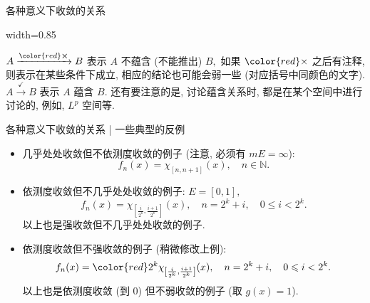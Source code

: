 
\begin{frame}{各种意义下收敛的关系}

\begin{adjustbox}{width=0.85\textwidth}

\end{adjustbox}

$A \xrightarrow{{\color{red} \boldsymbol{\times}}} B$ 表示 $A$ 不蕴含 (不能推出) $B,$ 如果 $\color{red} \times$ 之后有注释, 则表示在某些条件下成立, 相应的结论也可能会弱一些 (对应括号中同颜色的文字). $A \xrightarrow{\checkmark} B$ 表示 $A$ 蕴含 $B.$ 还有要注意的是, 讨论蕴含关系时, 都是在某个空间中进行讨论的, 例如, $L^p$ 空间等.

\end{frame}


\begin{frame}{各种意义下收敛的关系 | {\smaller[1] 一些典型的反例}}

\begin{itemize}[<+->]
\item 几乎处处收敛但不依测度收敛的例子 (注意, 必须有 $m E = \infty$):
\[f_n(x) = \chi_{[n, n + 1]}(x), \quad n \in \mathbb{N}.\]

\item 依测度收敛但不几乎处处收敛的例子: $E = [0, 1],$
\[f_n(x) = \chi_{\left[ \frac{i}{2^k}, \frac{i + 1}{2^k} \right]}(x), \quad n = 2^k + i, \quad 0 \leqslant i < 2^k.\]
以上也是强收敛但不几乎处处收敛的例子.

\item 依测度收敛但不强收敛的例子 (稍微修改上例):
\[f_n(x) = {\color{red} 2^k} \chi_{\left[ \frac{i}{2^k}, \frac{i + 1}{2^k} \right]}(x), \quad n = 2^k + i, \quad 0 \leqslant i < 2^k.\]
以上也是依测度收敛 (到 $0$) 但不弱收敛的例子 (取 $g(x) = 1$).
\end{itemize}

\end{frame}


